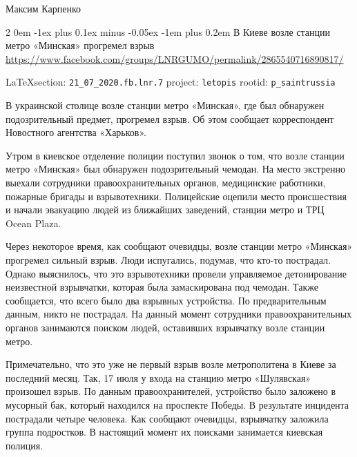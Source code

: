 \documentclass[a4paper,11pt]{extreport}
\makeatletter
\renewcommand\subsection{%
  \clearpage
    \@startsection{subsection}%
    {2}%
    {0em}%
    {-1ex plus 0.1ex minus -0.05ex}%
    {-1em plus 0.2em}%
    {\scshape\bfseries\Large}%
}
\makeatother
\begin{document}
Максим Карпенко
  
 
 
\subsection{В Киеве возле станции метро «Минская» прогремел взрыв}
\label{sec:21_07_2020.fb.lnr.7}
\url{https://www.facebook.com/groups/LNRGUMO/permalink/2865540716890817/}
  
\vspace{0.5cm}
{\small\LaTeX section: \verb|21_07_2020.fb.lnr.7| project: \verb|letopis| rootid: \verb|p_saintrussia|}
\vspace{0.5cm}

  
В украинской столице возле станции метро «Минская», где был обнаружен
подозрительный предмет, прогремел взрыв. Об этом сообщает корреспондент
Новостного агентства «Харьков». 

Утром в киевское отделение полиции поступил звонок о том, что возле станции
метро «Минская» был обнаружен подозрительный чемодан. На место экстренно
выехали сотрудники правоохранительных органов, медицинские работники, пожарные
бригады и взрывотехники. Полицейские оцепили место происшествия и начали
эвакуацию людей из ближайших заведений, станции метро и ТРЦ Ocean Plaza. 

Через некоторое время, как сообщают очевидцы, возле станции метро «Минская»
прогремел сильный взрыв. Люди испугались, подумав, что кто-то пострадал. Однако
выяснилось, что это взрывотехники провели управляемое детонирование неизвестной
взрывчатки, которая была замаскирована под чемодан. Также сообщается, что всего
было два взрывных устройства. По предварительным данным, никто не пострадал. На
данный момент сотрудники правоохранительных органов занимаются поиском людей,
оставивших взрывчатку возле станции метро. 

Примечательно, что это уже не первый взрыв возле метрополитена в Киеве за
последний месяц. Так, 17 июля у входа на станцию метро «Шулявская» произошел
взрыв. По данным правоохранителей, устройство было заложено в мусорный бак,
который находился на проспекте Победы. В результате инцидента пострадали четыре
человека. Как сообщают очевидцы, взрывчатку заложила группа подростков. В
настоящий момент их поисками занимается киевская полиция. 
\end{document}
